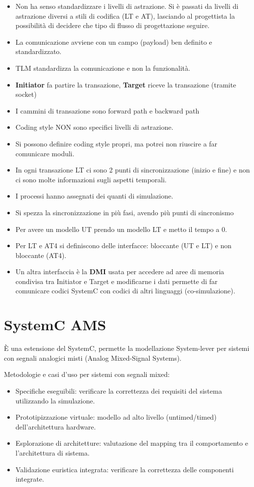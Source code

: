 \documentclass[a4paper]{article}
\theoremstyle{definition}
\begin{document}
	\begin{itemize}
		\item Non ha senso standardizzare i livelli di astrazione. Si è passati da livelli di astrazione diversi a stili di codifica (LT e AT), lasciando al progettista la possibilità di decidere che tipo di flusso di progettazione seguire.
		\item La comunicazione avviene con un campo (payload) ben definito e standardizzato.
		\item TLM standardizza la comunicazione e non la funzionalità.
		\item \textbf{Initiator} fa partire la transazione, \textbf{Target} riceve la transazione (tramite socket)
		\item I cammini di transazione sono forward path e backward path
		\item Coding style NON sono specifici livelli di astrazione.
		\item Si possono definire coding style propri, ma potrei non riuscire a far comunicare moduli.
		\item In ogni transazione LT ci sono 2 punti di sincronizzazione (inizio e fine) e non ci sono molte informazioni sugli aspetti temporali.
		\item I processi hanno assegnati dei quanti di simulazione.
		\item Si spezza la sincronizzazione in più fasi, avendo più punti di sincronismo
		\item Per avere un modello UT prendo un modello LT e metto il tempo a 0.
		\item Per LT e AT4 si definiscono delle interfacce: bloccante (UT e LT) e non bloccante (AT4).
		\item Un altra interfaccia è la \textbf{DMI} usata per accedere ad aree di memoria condivisa tra Initiator e Target e modificarne i dati permette di far comunicare codici SystemC con codici di altri linguaggi (co-simulazione).
	\end{itemize}

	\section{SystemC AMS}
		È una estensione del SystemC, permette la modellazione System-lever per sistemi con segnali analogici misti (Analog Mixed-Signal Systems). 
		
		\noindent
		Metodologie e casi d'uso per sistemi con segnali mixed:
		\begin{itemize}
			\item Specifiche eseguibili: verificare la correttezza dei requisiti del sistema utilizzando la simulazione.
			\item Prototipizzazione virtuale: modello ad alto livello (untimed/timed) dell'architettura hardware.
			\item Esplorazione di architetture: valutazione del mapping tra il comportamento e l'architettura di sistema.
			\item Validazione euristica integrata: verificare la correttezza delle componenti integrate.
		\end{itemize}
		
\end{document}
